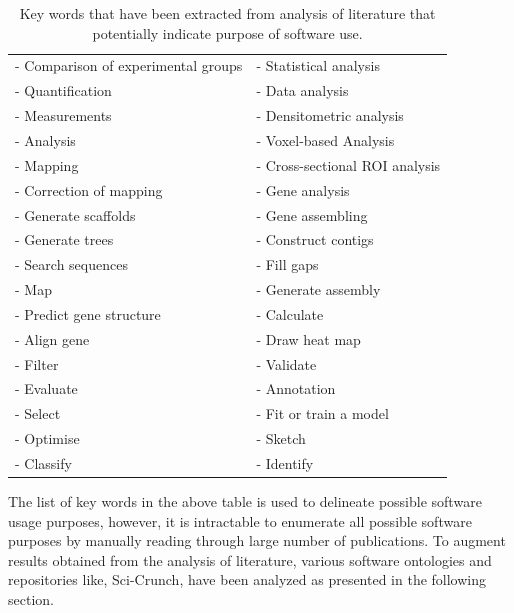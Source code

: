 \begin{table}[h!]
	\begin{center}
		\caption{Key words that have been extracted from analysis of literature that potentially indicate purpose of software use.}
		\label{tab:table1}
		\begin{tabular}{|l|l|} %
			
			\hline
			- Comparison of experimental groups & -	Statistical analysis  \\
			- Quantification & - Data analysis \\
			- Measurements   & - Densitometric analysis \\
			- Analysis       & - Voxel-based Analysis  \\
			- Mapping        & - Cross-sectional ROI analysis \\
			- Correction of mapping  & - Gene analysis     \\
			- Generate scaffolds     & - Gene assembling \\
			- Generate trees         & - Construct contigs \\
			- Search sequences       & - Fill gaps \\
			- Map                    & - Generate assembly \\
			- Predict gene structure & - Calculate \\
			- Align gene             & - Draw heat map \\
			- Filter                 & - Validate \\
			- Evaluate               & - Annotation \\
			- Select                 & - Fit or train a model \\ 
			- Optimise               & - Sketch \\
			- Classify               & - Identify \\
			
			\hline
		\end{tabular}
	\end{center}
\end{table}

The list of key words in the above table is used to delineate possible software usage purposes, however, it is intractable to enumerate all possible software purposes by manually reading through large number of publications. To augment results obtained from the analysis of literature, various software ontologies and repositories like, Sci-Crunch, have been analyzed as presented in the following section. 


